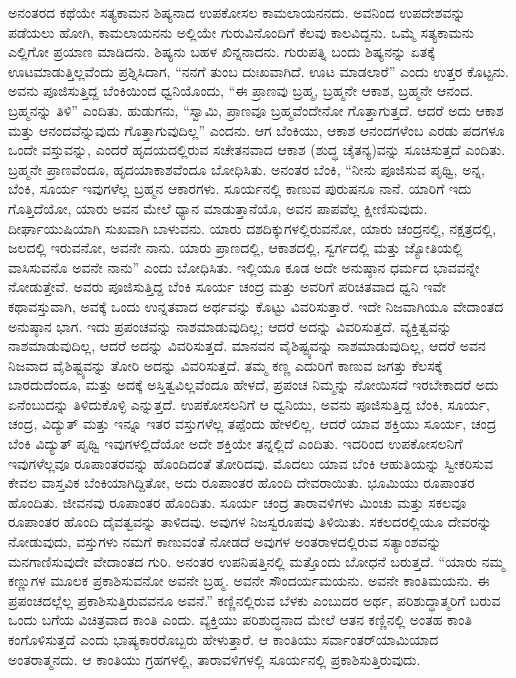 ಅನಂತರದ ಕಥೆಯೇ ಸತ್ಯಕಾಮನ ಶಿಷ್ಯನಾದ ಉಪಕೋಸಲ ಕಾಮಲಾಯನನದು. ಅವನಿಂದ ಉಪದೇಶವನ್ನು ಪಡೆಯಲು ಹೋಗಿ, ಕಾಮಲಾಯನನು ಅಲ್ಲಿಯೇ ಗುರುವಿನೊಂದಿಗೆ ಕೆಲವು ಕಾಲವಿದ್ದನು. ಒಮ್ಮೆ ಸತ್ಯಕಾಮನು ಎಲ್ಲಿಗೋ ಪ್ರಯಾಣ ಮಾಡಿದನು. ಶಿಷ್ಯನು ಬಹಳ ಖಿನ್ನನಾದನು. ಗುರುಪತ್ನಿ ಬಂದು ಶಿಷ್ಯನನ್ನು ಏತಕ್ಕೆ ಊಟಮಾಡುತ್ತಿಲ್ಲವೆಂದು ಪ್ರಶ್ನಿಸಿದಾಗ, “ನನಗೆ ತುಂಬ ದುಃಖವಾಗಿದೆ. ಊಟ ಮಾಡಲಾರೆ” ಎಂದು ಉತ್ತರ ಕೊಟ್ಟನು. ಅವನು ಪೂಜಿಸುತ್ತಿದ್ದ ಬೆಂಕಿಯಿಂದ ಧ್ವನಿಯೊಂದು, “ಈ ಪ್ರಾಣವು ಬ್ರಹ್ಮ, ಬ್ರಹ್ಮನೇ ಆಕಾಶ, ಬ್ರಹ್ಮನೇ ಆನಂದ. ಬ್ರಹ್ಮನನ್ನು ತಿಳಿ” ಎಂದಿತು. ಹುಡುಗನು, “ಸ್ವಾಮಿ, ಪ್ರಾಣವೂ ಬ್ರಹ್ಮವೆಂದೇನೋ ಗೊತ್ತಾಗುತ್ತದೆ. ಆದರೆ ಅದು ಆಕಾಶ ಮತ್ತು ಆನಂದವೆನ್ನುವುದು ಗೊತ್ತಾಗುವುದಿಲ್ಲ” ಎಂದನು. ಆಗ ಬೆಂಕಿಯು, ಆಕಾಶ ಆನಂದಗಳೆಂಬ ಎರಡು ಪದಗಳೂ ಒಂದೇ ವಸ್ತುವನ್ನು, ಎಂದರೆ ಹೃದಯದಲ್ಲಿರುವ ಸಚೇತನವಾದ ಆಕಾಶ (ಶುದ್ಧ ಚೈತನ್ಯ)ವನ್ನು ಸೂಚಿಸುತ್ತದೆ ಎಂದಿತು. ಬ್ರಹ್ಮನೇ ಪ್ರಾಣವೆಂದೂ, ಹೃದಯಾಕಾಶವೆಂದೂ ಬೋಧಿಸಿತು. ಅನಂತರ ಬೆಂಕಿ, “ನೀನು ಪೂಜಿಸುವ ಪೃಥ್ವಿ, ಅನ್ನ, ಬೆಂಕಿ, ಸೂರ್ಯ ಇವುಗಳೆಲ್ಲ ಬ್ರಹ್ಮನ ಆಕಾರಗಳು. ಸೂರ್ಯನಲ್ಲಿ ಕಾಣುವ ಪುರುಷನೂ ನಾನೆ. ಯಾರಿಗೆ ಇದು ಗೊತ್ತಿದೆಯೋ, ಯಾರು ಅವನ ಮೇಲೆ ಧ್ಯಾನ ಮಾಡುತ್ತಾನೆಯೊ, ಅವನ ಪಾಪವೆಲ್ಲ ಕ್ಷೀಣಿಸುವುದು. ದೀರ್ಘಾಯುಷಿಯಾಗಿ ಸುಖವಾಗಿ ಬಾಳುವನು. ಯಾರು ದಶದಿಕ್ಕುಗಳಲ್ಲಿರುವನೋ, ಯಾರು ಚಂದ್ರನಲ್ಲಿ, ನಕ್ಷತ್ರದಲ್ಲಿ, ಜಲದಲ್ಲಿ ಇರುವನೋ, ಅವನೇ ನಾನು. ಯಾರು ಪ್ರಾಣದಲ್ಲಿ, ಆಕಾಶದಲ್ಲಿ, ಸ್ವರ್ಗದಲ್ಲಿ ಮತ್ತು ಜ್ಯೋತಿಯಲ್ಲಿ ವಾಸಿಸುವನೊ ಅವನೇ ನಾನು” ಎಂದು ಬೋಧಿಸಿತು. ಇಲ್ಲಿಯೂ ಕೂಡ ಅದೇ ಅನುಷ್ಠಾನ ಧರ್ಮದ ಭಾವವನ್ನೇ ನೋಡುತ್ತೇವೆ. ಅವರು ಪೂಜಿಸುತ್ತಿದ್ದ ಬೆಂಕಿ ಸೂರ್ಯ ಚಂದ್ರ ಮತ್ತು ಅವರಿಗೆ ಪರಿಚಿತವಾದ ಧ್ವನಿ ಇವೇ ಕಥಾವಸ್ತುವಾಗಿ, ಅವಕ್ಕೆ ಒಂದು ಉನ್ನತವಾದ ಅರ್ಥವನ್ನು ಕೊಟ್ಟು ವಿವರಿಸುತ್ತಾರೆ. ಇದೇ ನಿಜವಾಗಿಯೂ ವೇದಾಂತದ ಅನುಷ್ಠಾನ ಭಾಗ. ಇದು ಪ್ರಪಂಚವನ್ನು ನಾಶಮಾಡುವುದಿಲ್ಲ; ಆದರೆ ಅದನ್ನು ವಿವರಿಸುತ್ತದೆ. ವ್ಯಕ್ತಿತ್ವವನ್ನು ನಾಶಮಾಡುವುದಿಲ್ಲ, ಆದರೆ ಅದನ್ನು ವಿವರಿಸುತ್ತದೆ. ಮಾನವನ ವೈಶಿಷ್ಟ್ಯವನ್ನು ನಾಶಮಾಡುವುದಿಲ್ಲ, ಆದರೆ ಅವನ ನಿಜವಾದ ವೈಶಿಷ್ಟ್ಯವನ್ನು ತೋರಿ ಅದನ್ನು ವಿವರಿಸುತ್ತದೆ. ತಮ್ಮ ಕಣ್ಣ ಎದುರಿಗೆ ಕಾಣುವ ಜಗತ್ತು ಕೆಲಸಕ್ಕೆ ಬಾರದುದೆಂದೂ, ಮತ್ತು ಅದಕ್ಕೆ ಅಸ್ತಿತ್ವವಿಲ್ಲವೆಂದೂ ಹೇಳದೆ, ಪ್ರಪಂಚ ನಿಮ್ಮನ್ನು ನೋಯಿಸದೆ ಇರಬೇಕಾದರೆ ಅದು ಏನೆಂಬುದನ್ನು ತಿಳಿದುಕೊಳ್ಳಿ ಎನ್ನುತ್ತದೆ. ಉಪಕೋಸಲನಿಗೆ ಆ ಧ್ವನಿಯು, ಅವನು ಪೂಜಿಸುತ್ತಿದ್ದ ಬೆಂಕಿ, ಸೂರ್ಯ, ಚಂದ್ರ, ವಿದ್ಯುತ್​ ಮತ್ತು ಇನ್ನೂ ಇತರ ವಸ್ತುಗಳೆಲ್ಲ ತಪ್ಪೆಂದು ಹೇಳಲಿಲ್ಲ. ಆದರೆ ಯಾವ ಶಕ್ತಿಯು ಸೂರ್ಯ, ಚಂದ್ರ ಬೆಂಕಿ ವಿದ್ಯುತ್​ ಪೃಥ್ವಿ ಇವುಗಳಲ್ಲಿದೆಯೋ ಅದೇ ಶಕ್ತಿಯೇ ತನ್ನಲ್ಲಿದೆ ಎಂದಿತು. ಇದರಿಂದ ಉಪಕೋಸಲನಿಗೆ ಇವುಗಳೆಲ್ಲವೂ ರೂಪಾಂತರವನ್ನು ಹೊಂದಿದಂತೆ ತೋರಿದವು. ಮೊದಲು ಯಾವ ಬೆಂಕಿ ಆಹುತಿಯನ್ನು ಸ್ವೀಕರಿಸುವ ಕೇವಲ ವಾಸ್ತವಿಕ ಬೆಂಕಿಯಾಗಿದ್ದಿತೋ, ಅದು ರೂಪಾಂತರ ಹೊಂದಿ ದೇವರಾಯಿತು. ಭೂಮಿಯು ರೂಪಾಂತರ ಹೊಂದಿತು. ಜೀವನವು ರೂಪಾಂತರ ಹೊಂದಿತು. ಸೂರ್ಯ ಚಂದ್ರ ತಾರಾವಳಿಗಳು ಮಿಂಚು ಮತ್ತು ಸಕಲವೂ ರೂಪಾಂತರ ಹೊಂದಿ ದೈವತ್ವವನ್ನು ತಾಳಿದವು. ಅವುಗಳ ನಿಜಸ್ವರೂಪವು ತಿಳಿಯಿತು. ಸಕಲದರಲ್ಲಿಯೂ ದೇವರನ್ನು ನೋಡುವುದು, ವಸ್ತುಗಳು ನಮಗೆ ಕಾಣುವಂತೆ ನೋಡದೆ ಅವುಗಳ ಅಂತರಾಳದಲ್ಲಿರುವ ಸತ್ಯಾಂಶವನ್ನು ಮನಗಾಣಿಸುವುದೇ ವೇದಾಂತದ ಗುರಿ. ಅನಂತರ ಉಪನಿಷತ್ತಿನಲ್ಲಿ ಮತ್ತೊಂದು ಬೋಧನೆ ಬರುತ್ತದೆ. “ಯಾರು ನಮ್ಮ ಕಣ್ಣುಗಳ ಮೂಲಕ ಪ್ರಕಾಶಿಸುವನೋ ಅವನೇ ಬ್ರಹ್ಮ. ಅವನೇ ಸೌಂದರ್ಯಮಯನು. ಅವನೇ ಕಾಂತಿಮಯನು. ಈ ಪ್ರಪಂಚದಲ್ಲೆಲ್ಲ ಪ್ರಕಾಶಿಸುತ್ತಿರುವವನೂ ಅವನೆ.” ಕಣ್ಣಿನಲ್ಲಿರುವ ಬೆಳಕು ಎಂಬುದರ ಅರ್ಥ, ಪರಿಶುದ್ಧಾತ್ಮರಿಗೆ ಬರುವ ಒಂದು ಬಗೆಯ ವಿಚಿತ್ರವಾದ ಕಾಂತಿ ಎಂದು. ವ್ಯಕ್ತಿಯು ಪರಿಶುದ್ಧನಾದ ಮೇಲೆ ಆತನ ಕಣ್ಣಿನಲ್ಲಿ ಅಂತಹ ಕಾಂತಿ ಕಂಗೊಳಿಸುತ್ತದೆ ಎಂದು ಭಾಷ್ಯಕಾರರೊಬ್ಬರು ಹೇಳುತ್ತಾರೆ. ಆ ಕಾಂತಿಯು ಸರ್ವಾಂತರ್‌ಯಾಮಿಯಾದ ಅಂತರಾತ್ಮನದು. ಆ ಕಾಂತಿಯು ಗ್ರಹಗಳಲ್ಲಿ, ತಾರಾವಳಿಗಳಲ್ಲಿ ಸೂರ್ಯನಲ್ಲಿ ಪ್ರಕಾಶಿಸುತ್ತಿರುವುದು. 

